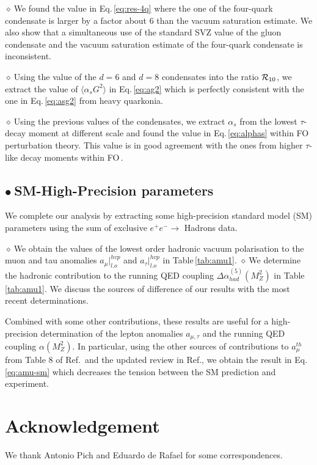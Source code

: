 \documentclass[review]{elsarticle}
\def\la{\langle}
\def\ra{\rangle}
\def\b{$\bullet~$}
\def\d{$\diamond~$}
\begin{document}
\d  We found the value in Eq.\,\ref{eq:res-4q} where the one of the four-quark condensate is larger by a factor about 6 than the vacuum saturation estimate. We also show that a simultaneous use of the standard SVZ value of the gluon condensate and the vacuum saturation estimate of the four-quark condensate is inconsistent. 

\d Using the value of the $d=6$ and $d=8$ condensates into the ratio ${\cal R}_{10}$, we extract the value of $\la\alpha_s G^2\ra$ in Eq.\,\ref{eq:ag2} which is perfectly consistent with the one in Eq.\,\ref{eq:asg2} from heavy quarkonia. 


\d Using the previous values of the condensates, we extract $\alpha_s$ from the lowest $\tau$-decay moment at different scale and found the value in Eq.\,\ref{eq:alphas} within FO perturbation theory. This value is in good agreement with the ones from higher $\tau$-like decay moments within FO\,\cite{PICH2}. 

\subsection*{\b SM-High-Precision parameters}
We complete our analysis by extracting some high-precision standard model (SM) parameters using the sum of exclusive $e^+e^-\to$ Hadrons data.

\d We obtain the values of the lowest order hadronic vacuum polarisation to the muon and tau anomalies $a_\mu\vert^{hvp}_{l.o}$ and $a_\tau\vert^{hvp}_{l.o}$ in Table\,\ref{tab:amu1}. 
\d We determine the hadronic contribution  to the running QED coupling $ \Delta \alpha_{had}^{(5)} (M_Z^2)$ in Table\,\ref{tab:amu1}. We discuss the sources of difference of our results with the most recent determinations.

Combined with some other contributions, these results are useful for a high-precision determination of the lepton anomalies $a_{\mu,\tau}$ and the running QED coupling $\alpha(M_Z^2)$.  In particular, using  the other sources of contributions to $a_\mu^{th}$ from Table 8 of Ref.\,\cite{KNECHT} and the updated review in Ref.\cite{GM2}, we obtain the result in Eq.\,\ref{eq:amu-sm} which decreases the tension between the SM prediction and experiment.  

\section*{Acknowledgement}
We thank %
Antonio Pich and  Eduardo de Rafael for some correspondences.
\newpage

\end{document}
